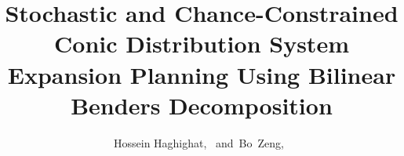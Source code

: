 \documentclass[journal]{IEEEtran}
\theoremstyle{remark}
\begin{document}
%
\title{Stochastic and Chance-Constrained Conic  Distribution System Expansion Planning Using Bilinear Benders Decomposition}
%
%
%

\author{Hossein Haghighat,~
        and~Bo~Zeng,~%
}

%
%



\markboth{}%
{}
%
\end{document}
